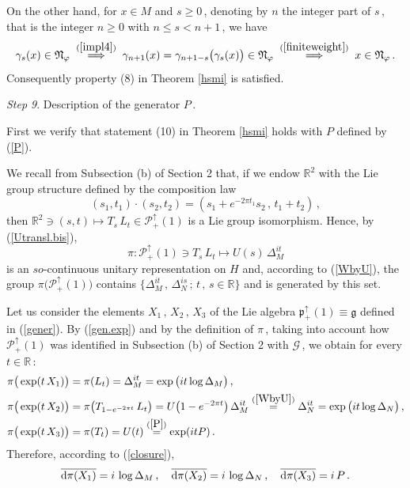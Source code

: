 \documentclass[reqno]{amsart}
\theoremstyle{definition}
\theoremstyle{remark}
\numberwithin{equation}{section}
\theoremstyle{plain}
\begin{document}
On the other hand, for $x\in M$ and $s\geq 0\,$, denoting by $n$
the integer part of $s\,$, that is the integer $n\geq 0$ with
$n\leq s<n+1\,$, we have
\begin{equation*}
\gamma_s (x)\in\mathfrak N_\varphi\;
\overset{(\ref{impl4})}{\Longrightarrow}\; \gamma_{n+1}
(x)=\gamma_{n+1-s}\big(\gamma_s (x)\big)\in\mathfrak N_\varphi\;
\overset{(\ref{finiteweight})}{\Longrightarrow}\; x\in
\mathfrak N_\varphi\, .
\end{equation*}
Consequently property (8) in Theorem \ref{hsmi} is satisfied.
\bigskip

{\it Step 9}. {\sc Description of the generator $P\,$.}
\medskip

First we verify that statement (10) in Theorem \ref{hsmi} holds
with $P$ defined by (\ref{P}).

We recall from Subsection (b) of Section 2 that, if we endow
$\mathbb R^2$ with the Lie group structure defined by the
composition law
\begin{equation*}
(s_1 ,t_1)\cdot (s_2 ,t_2) = (s_1 +e^{-2\pi t_1} s_2\, ,\,
t_1+t_2 )\, ,
\end{equation*}
then $\mathbb R^2\ni (s ,t)\longmapsto T_s\, L_t\in
\mathcal P_+^\uparrow (1)$ is a Lie group isomorphism. Hence,
by (\ref{Utransl.bis}),
\begin{equation*}
\pi : \mathcal P_+^\uparrow (1)\ni T_s\, L_t\longmapsto
U(s)\,\Delta_M^{i t}
\end{equation*}
is an $so$-continuous unitary representation on $H$ and, according
to (\ref{WbyU}), the group $\pi \big(\mathcal P_+^\uparrow (1)\big)$
contains $\{ \Delta_M^{it}\, ,\,\Delta_N^{is}\, ;\, t\, ,\, s\in
\mathbb R\}$ and is generated by this set.

Let us consider the elements $X_1\, ,\, X_2\, ,\, X_3$ of the Lie
algebra $\mathfrak p_+^\uparrow (1)\equiv\mathfrak g$ defined in
(\ref{gener}). By (\ref{gen.exp}) and by the definition of $\pi\,$,
taking into account how $\mathcal P_+^\uparrow (1)$ was identified in
Subsection (b) of Section 2 with $\mathcal G\,$, we obtain for every
$t\in\mathbb R\,$:
\begin{align*}
&\pi\big( \exp (t\, X_1)\big) =\pi (L_t) =\Delta_M^{i t}=
\exp\big( i t \log \Delta_M \big)\, , \\
&\pi\big( \exp (t\, X_2)\big) =\pi \big( T_{1-e^{-2\pi t}}\, L_t\big)
=U\big( 1-e^{-2\pi t}\big)\,\Delta_M^{i t}
\overset{(\ref{WbyU})}{=}\Delta_N^{i t}=
\exp\big( i t \log \Delta_N \big)\, , \\
&\pi\big( \exp (t\, X_3)\big) =\pi (T_t) =U(t)
\overset{(\ref{P})}{=}\exp (i t P)\, .
\end{align*}
Therefore, according to (\ref{closure}),
\begin{equation}\label{mapping}
\overline{\text{\rm d}\pi (X_1)}=i\,\log \Delta_M\, ,\quad
\overline{\text{\rm d}\pi (X_2)}=i\,\log \Delta_N\, ,\quad
\overline{\text{\rm d}\pi (X_3)}=i\, P\, .
\end{equation}
\end{document}
